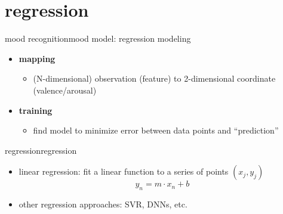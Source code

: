     \section{regression}
        \begin{frame}{mood recognition}{mood model: regression modeling}
            \begin{itemize}
                \item   \textbf{mapping} 
                    \begin{itemize}
                        \item (N-dimensional) observation (feature) to 2-dimensional coordinate (valence/arousal)
                    \end{itemize}
                \bigskip
                \item   \textbf{training}
                    \begin{itemize}
                        \item find model to minimize error between data points and ``prediction''
                    \end{itemize}
            \end{itemize}
        \end{frame}
                
        \begin{frame}{regression}{regression}
            \begin{itemize}
                \item linear regression: fit a linear function to a series of points  $(x_j,y_j)$
                    \begin{equation*}
                        y_n = m\cdot x_n + b
                    \end{equation*}
                \item   other regression approaches: SVR, DNNs, etc.
            \end{itemize}
        \end{frame}
                
